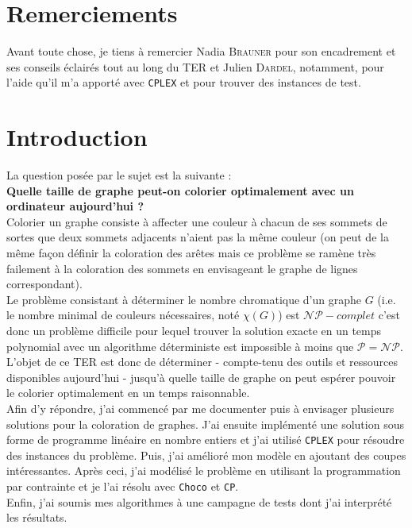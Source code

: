 \setcounter{page}{1}

\section*{Remerciements}
Avant toute chose, je tiens à remercier Nadia \textsc{Brauner} pour son encadrement et ses conseils
éclairés tout au long du TER et Julien \textsc{Dardel}, notamment,
pour l'aide qu'il m'a apporté avec \verb?CPLEX?
et pour trouver des instances de test.

\section{Introduction}
La question posée par le sujet est la suivante :\\
\textbf{Quelle taille de graphe peut-on colorier optimalement avec un ordinateur aujourd'hui ?}\\

Colorier un graphe consiste à affecter une couleur à chacun de ses
sommets de sortes que deux sommets adjacents n'aient pas la même couleur (on peut de la même façon définir
la coloration des arêtes mais ce problème se ramène très failement à la coloration des sommets en envisageant
le graphe de lignes correspondant).\\
Le problème consistant à déterminer le nombre chromatique d'un graphe $G$
(i.e. le nombre minimal de couleurs nécessaires, noté $\chi(G)$)
est $\mathcal{NP}-complet$ c'est donc un problème difficile pour lequel trouver la solution exacte en
un temps polynomial avec un algorithme déterministe est impossible à moins que $\mathcal{P}=\mathcal{NP}$.\\

L'objet de ce TER est donc de déterminer - compte-tenu des outils et ressources disponibles aujourd'hui -
jusqu'à quelle taille de graphe on peut espérer pouvoir le colorier optimalement en un temps raisonnable.\\

Afin d'y répondre, j'ai commencé par me documenter puis à envisager plusieurs solutions pour la coloration de graphes.
J'ai ensuite implémenté une solution sous forme de programme linéaire en nombre entiers et j'ai utilisé \verb?CPLEX?
pour résoudre des instances du problème. Puis, j'ai amélioré mon modèle en ajoutant des coupes intéressantes.
Après ceci, j'ai modélisé le problème en utilisant la programmation par contrainte et je l'ai
résolu avec \verb?Choco? et \verb?CP?.\\
Enfin, j'ai soumis mes algorithmes à une campagne de tests dont j'ai interprété les résultats.\\

